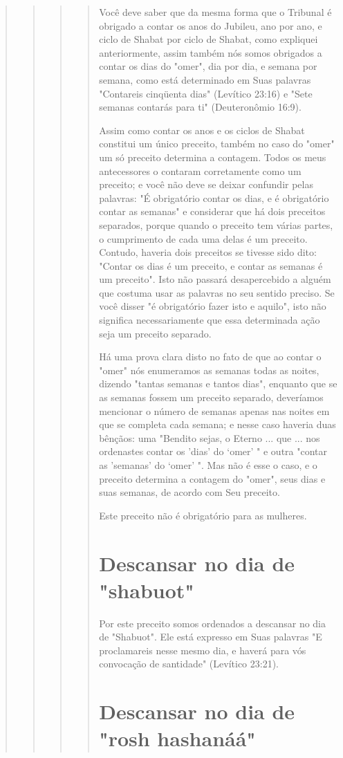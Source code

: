 \begin{quote}
\begin{quote}
\begin{quote}
\begin{quote}


Você deve saber que da mesma forma que o Tribunal é obrigado a contar os
anos do Jubileu, ano por ano, e ciclo de Shabat por ciclo de Shabat,
como expliquei anteriormente, assim também nós somos obrigados a contar
os dias do "omer", dia por dia, e semana por semana, como está
determinado em Suas palavras "Contareis cinqüenta dias" (Levítico 23:16)
e "Sete semanas contarás para ti" (Deuteronômio 16:9).

Assim como contar os anos e os ciclos de Shabat constitui um único
preceito, também no caso do "omer" um só preceito determina a contagem.
Todos os meus antecessores o contaram corretamente como um preceito; e
você não deve se deixar confundir pelas palavras: "É obrigatório contar
os dias, e é obrigatório contar as semanas" e considerar que há dois
preceitos separados, porque quando o preceito tem várias partes, o
cumprimento de cada uma delas é um preceito. Contudo, haveria dois
preceitos se tivesse sido dito: "Contar os dias é um preceito, e contar
as semanas é um preceito". Isto não passará desapercebido a alguém que
costuma usar as palavras no seu sentido preciso. Se você disser "é
obrigatório fazer isto e aquilo", isto não significa necessaria­mente
que essa determinada ação seja um preceito separado.

Há uma prova clara disto no fato de que ao contar o "omer" nós
enumeramos as semanas todas as noites, dizendo "tantas semanas e tantos
dias", enquanto que se as semanas fossem um preceito separado,
deveríamos men­cionar o número de semanas apenas nas noites em que se
completa cada sema­na; e nesse caso haveria duas bênçãos: uma "Bendito
sejas, o Eterno ... que ... nos ordenastes contar os 'dias' do `omer' "
e outra "contar as 'semanas' do `omer' ". Mas não é esse o caso, e o
preceito determina a contagem do "omer", seus dias e suas semanas, de
acordo com Seu preceito.

Este preceito não é obrigatório para as mulheres.

\section{Descansar no dia de "shabuot"}

Por este preceito somos ordenados a descansar no dia de "Shabuot". Ele
está expresso em Suas palavras "E proclamareis nesse mesmo dia, e haverá
para vós convocação de santidade" (Levítico 23:21).

\section{Descansar no dia de "rosh hashanáá"}


\end{quote}
\end{quote}
\end{quote}
\end{quote}
